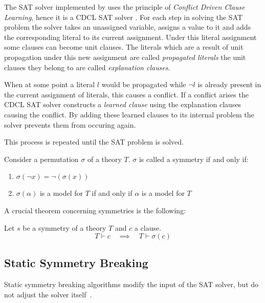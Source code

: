 
	The SAT solver implemented by \cite{devriendt2012symmetry} uses the principle of \emph{Conflict Driven Clause Learning}, hence it is a CDCL SAT solver \cite{zhang2001efficient}.
	For each step in solving the SAT problem the solver takes an unassigned variable, assigns a value to it and adds the corresponding literal to its current assignment.
	Under this literal assignment some clauses can become unit clauses. The literals which are a result of unit propagation under this new assignment are called \emph{propagated literals} the unit clauses they belong to are called \emph{explanation clauses}.
	
	When at some point a literal $l$ would be propagated while $\neg l$ is already present in the current assignment of literals, this causes a conflict.
	If a conflict arises the CDCL SAT solver constructs a \emph{learned clause} using the explanation clauses causing the conflict.
	By adding these learned clauses to its internal problem the solver prevents them from occuring again.
	
	This process is repeated until the SAT problem is solved.

		Consider a permutation $\sigma$ of a theory $T$.
		$\sigma$ is called a symmetry if and only if:

		\begin{enumerate}
			\item $\sigma(\neg x) = \neg(\sigma( x ))$
			\item $\sigma(\alpha )$ is a model for $T$ if and only if $\alpha$ is a model for
				$T$
		\end{enumerate}

		A crucial theorem concerning symmetries is the following: \\

		\begin{proposition}
			\label{prop:symmetric_clause_learning}
			Let $s$ be a symmetry of a theory $T$ and $c$ a clause.
			\begin{equation}
				T \vdash c \quad \implies \quad T \vdash \sigma( c )
			\end{equation}
		\end{proposition}

\subsection{Static Symmetry Breaking}
	Static symmetry breaking algorithms modify the input of the SAT solver, but do not
	adjust the solver itself~\cite{sakallah2009symmetry}.

